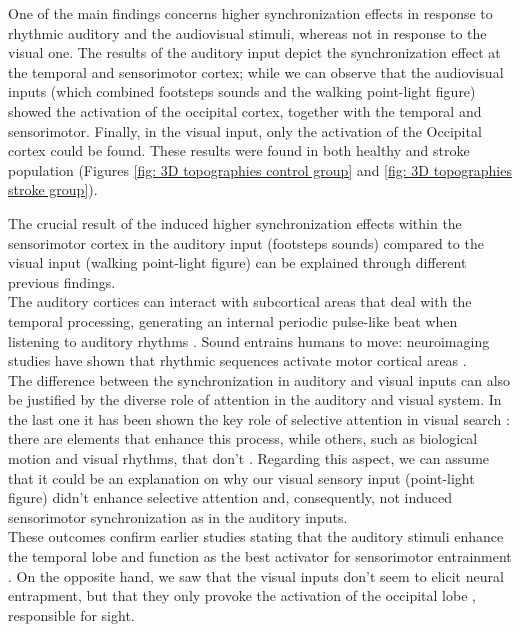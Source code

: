 One of the main findings concerns higher synchronization effects in response to rhythmic auditory and the audiovisual stimuli, whereas not in response to the visual one. The results of the auditory input depict the synchronization effect at the temporal and sensorimotor cortex; while we can observe that the audiovisual inputs (which combined footsteps sounds and the walking point-light figure) showed the activation of the occipital cortex, together with the temporal and sensorimotor. Finally, in the visual input, only the activation of the Occipital cortex could be found. These results were found in both healthy and stroke population (Figures \ref{fig: 3D topographies control group} and \ref{fig: 3D topographies stroke group}).

The crucial result of the induced higher synchronization effects within the sensorimotor cortex in the auditory input (footsteps sounds) compared to the visual input (walking point-light figure) can be explained through different previous findings. \\
The auditory cortices can interact with subcortical areas that deal with the temporal processing, generating an internal periodic pulse-like beat when listening to auditory rhythms \parencite{Nozaradan_2017}. Sound entrains humans to move: neuroimaging studies have shown that rhythmic sequences activate motor cortical areas \parencite{Grahn_2007}. \\
The difference between the synchronization in auditory and visual inputs can also be justified by the diverse role of attention in the auditory and visual system. In the last one it has been shown the key role of selective attention in visual search \parencite{Keshvari_2016}: there are elements that enhance this process, while others, such as biological motion and visual rhythms, that don't \parencite{Wolfe_2017}. Regarding this aspect, we can assume that it could be an explanation on why our visual sensory input (point-light figure) didn't enhance selective attention and, consequently, not induced sensorimotor synchronization as in the auditory inputs. \\
These outcomes confirm earlier studies stating that the auditory stimuli enhance the temporal lobe and function as the best activator for sensorimotor entrainment \parencite{Thaut_1999}. On the opposite hand, we saw that the visual inputs don't seem to elicit neural entrapment, but that they only provoke the activation of the occipital lobe \parencite{Nehmad_1998}, responsible for sight. 

